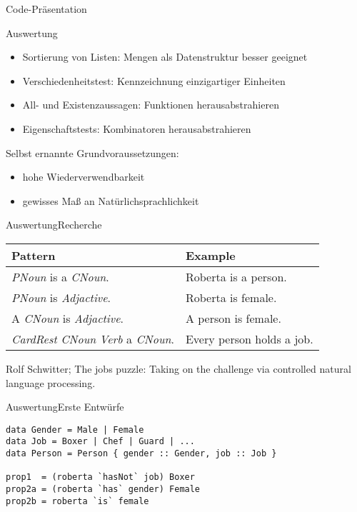 \documentclass[hyperref={pdfpagelabels=false}]{beamer}
\begin{document}
\begin{frame}
\centering
\Huge \color{darkblue} Code-Pr\"asentation
\end{frame}

\begin{frame}{Auswertung}
\begin{itemize}
\item Sortierung von Listen: Mengen als Datenstruktur besser geeignet
\item Verschiedenheitstest: Kennzeichnung einzigartiger Einheiten
\item All- und Existenzaussagen: Funktionen herausabstrahieren
\item Eigenschaftstests: Kombinatoren herausabstrahieren
\end{itemize}
\pause
Selbst ernannte Grundvoraussetzungen:
\begin{itemize}
\item hohe Wiederverwendbarkeit
\item gewisses Ma\ss{} an Nat\"urlichsprachlichkeit
\end{itemize}
\end{frame}

\begin{frame}{Auswertung}{Recherche}
\begin{tabular}{ll}
\hline
\hline
\large \textbf{Pattern} & \large\textbf{Example}\\
\hline
\emph{PNoun} is a \emph{CNoun}. & Roberta is a person.\\
\emph{PNoun} is \emph{Adjactive}.& Roberta is female.\\
A \emph{CNoun} is \emph{Adjactive}. & A person is female.\\
\emph{CardRest} \emph{CNoun} \emph{Verb} a \emph{CNoun}.
 & Every person holds a job. \\
\hline
\hline
\end{tabular}
\vfill
\footnotesize Rolf Schwitter; The jobs puzzle: Taking on the challenge via controlled natural language processing.
\end{frame}

\begin{frame}[fragile]{Auswertung}{Erste Entw\"urfe}
\begin{lstlisting}
data Gender = Male | Female
data Job = Boxer | Chef | Guard | ...
data Person = Person { gender :: Gender, job :: Job }

prop1  = (roberta `hasNot` job) Boxer
prop2a = (roberta `has` gender) Female
prop2b = roberta `is` female
\end{lstlisting}
\end{frame}
\end{document}
